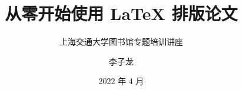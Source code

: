 
\title{从零开始使用 \LaTeX{} 排版论文}
\subtitle{上海交通大学图书馆专题培训讲座}
\author{李子龙}
\date{2022 年 4 月}
\subject{LaTeX, 论文排版, SJTUThesis}
\maketitle






\def\bottomthanks{Happy \TeX{}ing!}
\makebottom